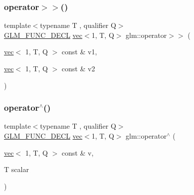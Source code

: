 \subsubsection{\texorpdfstring{operator$>$$>$()}{operator>>()}\hspace{0.1cm}{\footnotesize\ttfamily [3/3]}}
{\footnotesize\ttfamily template$<$typename T , qualifier Q$>$ \\
\hyperlink{setup_8hpp_ab2d052de21a70539923e9bcbf6e83a51}{G\+L\+M\+\_\+\+F\+U\+N\+C\+\_\+\+D\+E\+CL} \hyperlink{structglm_1_1vec}{vec}$<$1, T, Q$>$ glm\+::operator$>$$>$ (\begin{DoxyParamCaption}\item[{\hyperlink{structglm_1_1vec}{vec}$<$ 1, T, Q $>$ const \&}]{v1,  }\item[{\hyperlink{structglm_1_1vec}{vec}$<$ 1, T, Q $>$ const \&}]{v2 }\end{DoxyParamCaption})}

\mbox{\label{group__ext__vec1_ga5e3dabaa97accd1e6cf3853326605d3e}} 
\subsubsection{\texorpdfstring{operator$^\wedge$()}{operator^()}\hspace{0.1cm}{\footnotesize\ttfamily [1/3]}}
{\footnotesize\ttfamily template$<$typename T , qualifier Q$>$ \\
\hyperlink{setup_8hpp_ab2d052de21a70539923e9bcbf6e83a51}{G\+L\+M\+\_\+\+F\+U\+N\+C\+\_\+\+D\+E\+CL} \hyperlink{structglm_1_1vec}{vec}$<$1, T, Q$>$ glm\+::operator$^\wedge$ (\begin{DoxyParamCaption}\item[{\hyperlink{structglm_1_1vec}{vec}$<$ 1, T, Q $>$ const \&}]{v,  }\item[{T}]{scalar }\end{DoxyParamCaption})}

\mbox{\label{group__ext__vec1_gad8d8f5ba70c15af0a21dc1f79c2101b9}} 
